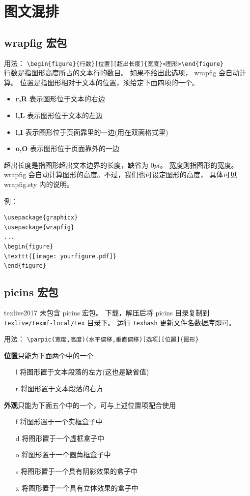 \documentclass[a4paper,11pt]{article}
\begin{document}
\section{图文混排}
\subsection{wrapfig 宏包}
用法：%
\verb+\begin{figure}{行数}[位置][超出长度]{宽度}<图形>\end{figure}+\\
行数是指图形高度所占的文本行的数目。 如果不给出此选项，
wrapfig 会自动计算。 位置是指图形相对于文本的位置，须给定下面四项的一个。
\begin{itemize}
	\item {\bf r,R} 表示图形位于文本的右边
	\item {\bf l,L} 表示图形位于文本的左边
	\item {\bf i,I} 表示图形位于页面靠里的一边(用在双面格式里)
	\item {\bf o,O} 表示图形位于页面靠外的一边
\end{itemize}
超出长度是指图形超出文本边界的长度，缺省为 $0pt$。 宽度则指图形的宽度。
wrapfig 会自动计算图形的高度。不过，我们也可设定图形的高度，
具体可见 wrapfig.sty 内的说明。

例：
\begin{Verbatim}
\usepackage{graphicx}
\usepackage{wrapfig}
...
\begin{figure}
\texttt{[image: yourfigure.pdf]}
\end{figure}
\end{Verbatim}

\subsection{picins 宏包}
texlive2017 未包含 picins 宏包。
下载，解压后将 picins 目录复制到 \verb+texlive/texmf-local/tex+ 目录下。
运行 \verb+texhash+ 更新文件名数据库即可。

用法：%
\verb+\parpic(宽度,高度)(水平偏移,垂直偏移)[选项][位置]{图形}+

{\bf 位置}只能为下面两个中的一个
\begin{itemize}
	\item [l] 将图形置于文本段落的左方(这也是缺省值)
	\item [r] 将图形置于文本段落的右方
\end{itemize}

{\bf 外观}只能为下面五个中的一个，可与上述位置项配合使用
\begin{itemize}
	\item [f] 将图形置于一个实框盒子中
	\item [d] 将图形置于一个虚框盒子中
	\item [o] 将图形置于一个圆角框盒子中
	\item [s] 将图形置于一个具有阴影效果的盒子中
	\item [x] 将图形置于一个具有立体效果的盒子中	
\end{itemize}
\end{document}
